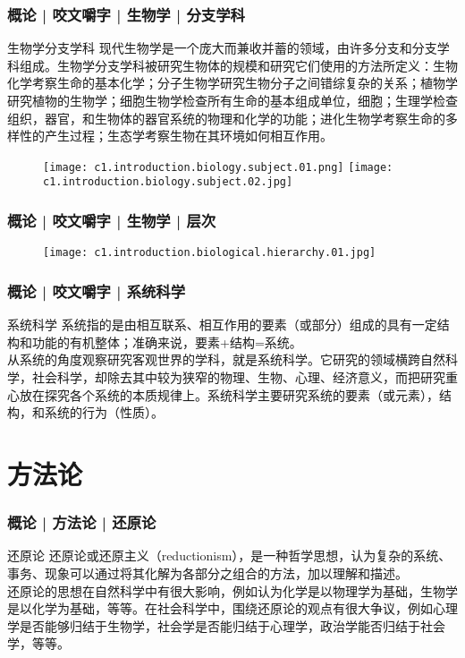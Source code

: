 \begin{frame}
  \frametitle{概论 | 咬文嚼字 | 生物学 | 分支学科}
  \begin{block}{生物学分支学科}
现代生物学是一个庞大而兼收并蓄的领域，由许多分支和分支学科组成。生物学分支学科被研究生物体的规模和研究它们使用的方法所定义：生物化学考察生命的基本化学；分子生物学研究生物分子之间错综复杂的关系；植物学研究植物的生物学；细胞生物学检查所有生命的基本组成单位，细胞；生理学检查组织，器官，和生物体的器官系统的物理和化学的功能；进化生物学考察生命的多样性的产生过程；生态学考察生物在其环境如何相互作用。
  \end{block}
  \begin{figure}
    \centering
    \texttt{[image: c1.introduction.biology.subject.01.png]}\qquad
    \texttt{[image: c1.introduction.biology.subject.02.jpg]}
  \end{figure}
\end{frame}

\begin{frame}
  \frametitle{概论 | 咬文嚼字 | 生物学 | 层次}
  \begin{figure}
    \centering
    \texttt{[image: c1.introduction.biological.hierarchy.01.jpg]}
  \end{figure}
\end{frame}

\begin{frame}
  \frametitle{概论 | 咬文嚼字 | 系统科学}
  \begin{block}{系统科学}
系统指的是由相互联系、相互作用的要素（或部分）组成的具有一定结构和功能的有机整体；准确来说，要素+结构=系统。\\
\vspace{1em}
从系统的角度观察研究客观世界的学科，就是系统科学。它研究的领域横跨自然科学，社会科学，却除去其中较为狭窄的物理、生物、心理、经济意义，而把研究重心放在探究各个系统的本质规律上。系统科学主要研究系统的要素（或元素），结构，和系统的行为（性质）。 
  \end{block}
\end{frame}

\section{方法论}
\begin{frame}
  \frametitle{概论 | 方法论 | 还原论}
  \begin{block}{还原论}
还原论或还原主义（reductionism），是一种哲学思想，认为复杂的系统、事务、现象可以通过将其化解为各部分之组合的方法，加以理解和描述。\\
\vspace{1em}
还原论的思想在自然科学中有很大影响，例如认为化学是以物理学为基础，生物学是以化学为基础，等等。在社会科学中，围绕还原论的观点有很大争议，例如心理学是否能够归结于生物学，社会学是否能归结于心理学，政治学能否归结于社会学，等等。
  \end{block}
\end{frame}

